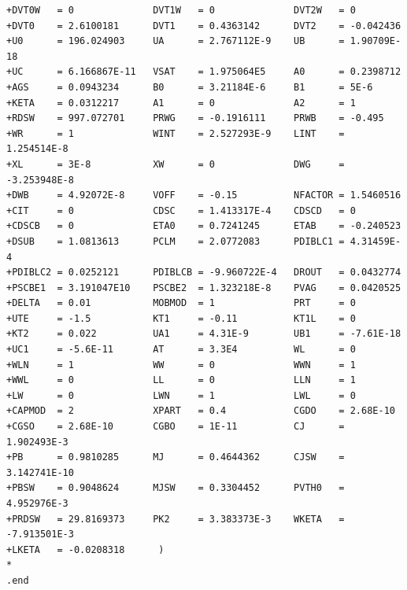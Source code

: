 \documentclass[12pt]{article}
\begin{document}
\begin{lstlisting}
+DVT0W   = 0              DVT1W   = 0              DVT2W   = 0
+DVT0    = 2.6100181      DVT1    = 0.4363142      DVT2    = -0.042436
+U0      = 196.024903     UA      = 2.767112E-9    UB      = 1.90709E-18
+UC      = 6.166867E-11   VSAT    = 1.975064E5     A0      = 0.2398712
+AGS     = 0.0943234      B0      = 3.21184E-6     B1      = 5E-6
+KETA    = 0.0312217      A1      = 0              A2      = 1
+RDSW    = 997.072701     PRWG    = -0.1916111     PRWB    = -0.495
+WR      = 1              WINT    = 2.527293E-9    LINT    = 1.254514E-8
+XL      = 3E-8           XW      = 0              DWG     = -3.253948E-8
+DWB     = 4.92072E-8     VOFF    = -0.15          NFACTOR = 1.5460516
+CIT     = 0              CDSC    = 1.413317E-4    CDSCD   = 0
+CDSCB   = 0              ETA0    = 0.7241245      ETAB    = -0.240523
+DSUB    = 1.0813613      PCLM    = 2.0772083      PDIBLC1 = 4.31459E-4
+PDIBLC2 = 0.0252121      PDIBLCB = -9.960722E-4   DROUT   = 0.0432774
+PSCBE1  = 3.191047E10    PSCBE2  = 1.323218E-8    PVAG    = 0.0420525
+DELTA   = 0.01           MOBMOD  = 1              PRT     = 0
+UTE     = -1.5           KT1     = -0.11          KT1L    = 0
+KT2     = 0.022          UA1     = 4.31E-9        UB1     = -7.61E-18
+UC1     = -5.6E-11       AT      = 3.3E4          WL      = 0
+WLN     = 1              WW      = 0              WWN     = 1
+WWL     = 0              LL      = 0              LLN     = 1
+LW      = 0              LWN     = 1              LWL     = 0
+CAPMOD  = 2              XPART   = 0.4            CGDO    = 2.68E-10
+CGSO    = 2.68E-10       CGBO    = 1E-11          CJ      = 1.902493E-3
+PB      = 0.9810285      MJ      = 0.4644362      CJSW    = 3.142741E-10
+PBSW    = 0.9048624      MJSW    = 0.3304452      PVTH0   = 4.952976E-3
+PRDSW   = 29.8169373     PK2     = 3.383373E-3    WKETA   = -7.913501E-3
+LKETA   = -0.0208318      )
*
.end
\end{lstlisting}
\end{document}
